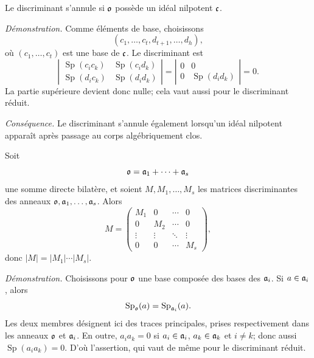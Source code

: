 Le discriminant s'annule si $\mathfrak{o}$ possède un idéal nilpotent $\mathfrak{c}$.

\emph{Démonstration.} Comme éléments de base, choisissons
\[
(c_1,\ldots,c_t,d_{t+1},\ldots,d_h),
\]
où $(c_1,\ldots,c_t)$ est une base de $\mathfrak{c}$. Le discriminant est
\[
\left|\begin{array}{cc}
\operatorname{Sp}(c_i c_k)&\operatorname{Sp}(c_i d_k)\\
\operatorname{Sp}(d_i c_k)&\operatorname{Sp}(d_i d_k)
\end{array}\right|
=
\left|\begin{array}{cc}
0&0\\
0&\operatorname{Sp}(d_i d_k)
\end{array}\right|=0.
\]
La partie supérieure devient donc nulle; cela vaut aussi pour le discriminant réduit.

\emph{Conséquence.} Le discriminant s'annule également lorsqu'un idéal nilpotent apparaît après passage au corps algébriquement clos.

Soit
\[
        \mathfrak{o}=\mathfrak{a}_1+\cdots+\mathfrak{a}_s
\]
une somme directe bilatère, et soient $M,M_1,\ldots,M_s$ les matrices discriminantes des anneaux $\mathfrak{o},\mathfrak{a}_1,\ldots,\mathfrak{a}_s$. Alors
\[
        M=\begin{pmatrix}
        M_1&0&\cdots&0\\
        0&M_2&\cdots&0\\
        \vdots&\vdots&\ddots&\vdots\\
        0&0&\cdots&M_s
        \end{pmatrix},
\]
donc $|M|=|M_1|\cdots|M_s|$.

\emph{Démonstration.} Choisissons pour $\mathfrak{o}$ une base composée des bases des $\mathfrak{a}_i$. Si $a\in\mathfrak{a}_i$, alors
\[
        \operatorname{Sp}_{\mathfrak{o}}(a)=\operatorname{Sp}_{\mathfrak{a}_i}(a).
\]
Les deux membres désignent ici des traces principales, prises respectivement dans les anneaux $\mathfrak{o}$ et $\mathfrak{a}_i$. En outre, $a_i a_k=0$ si $a_i\in\mathfrak{a}_i$, $a_k\in\mathfrak{a}_k$ et $i\ne k$; donc aussi $\operatorname{Sp}(a_i a_k)=0$. D'où l'assertion, qui vaut de même pour le discriminant réduit.

